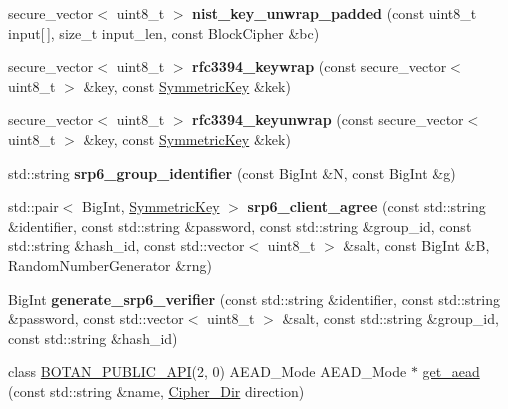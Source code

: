 \begin{DoxyCompactItemize}
\item 
\mbox{\label{namespace_botan_af6058b9d2ad2f93bddfb99ed6e6d6c7e}} 
secure\+\_\+vector$<$ uint8\+\_\+t $>$ {\bfseries nist\+\_\+key\+\_\+unwrap\+\_\+padded} (const uint8\+\_\+t input\mbox{[}$\,$\mbox{]}, size\+\_\+t input\+\_\+len, const Block\+Cipher \&bc)
\item 
\mbox{\label{namespace_botan_ad9093b300739b9305dcddeef2fdabd4f}} 
secure\+\_\+vector$<$ uint8\+\_\+t $>$ {\bfseries rfc3394\+\_\+keywrap} (const secure\+\_\+vector$<$ uint8\+\_\+t $>$ \&key, const \mbox{\hyperlink{namespace_botan_a89cf6c3513428f524454d01830221a88}{Symmetric\+Key}} \&kek)
\item 
\mbox{\label{namespace_botan_afbd37554903b2d7dc23b582e866b7b44}} 
secure\+\_\+vector$<$ uint8\+\_\+t $>$ {\bfseries rfc3394\+\_\+keyunwrap} (const secure\+\_\+vector$<$ uint8\+\_\+t $>$ \&key, const \mbox{\hyperlink{namespace_botan_a89cf6c3513428f524454d01830221a88}{Symmetric\+Key}} \&kek)
\item 
\mbox{\label{namespace_botan_a93bd21cfb41d35b060ae22dfbc366c22}} 
std\+::string {\bfseries srp6\+\_\+group\+\_\+identifier} (const Big\+Int \&N, const Big\+Int \&g)
\item 
\mbox{\label{namespace_botan_a23b9d9cc8d0b378865bcc049a88b7a78}} 
std\+::pair$<$ Big\+Int, \mbox{\hyperlink{namespace_botan_a89cf6c3513428f524454d01830221a88}{Symmetric\+Key}} $>$ {\bfseries srp6\+\_\+client\+\_\+agree} (const std\+::string \&identifier, const std\+::string \&password, const std\+::string \&group\+\_\+id, const std\+::string \&hash\+\_\+id, const std\+::vector$<$ uint8\+\_\+t $>$ \&salt, const Big\+Int \&B, Random\+Number\+Generator \&rng)
\item 
\mbox{\label{namespace_botan_a1967cc8d60add19e44753e8d74c8667e}} 
Big\+Int {\bfseries generate\+\_\+srp6\+\_\+verifier} (const std\+::string \&identifier, const std\+::string \&password, const std\+::vector$<$ uint8\+\_\+t $>$ \&salt, const std\+::string \&group\+\_\+id, const std\+::string \&hash\+\_\+id)
\item 
class \mbox{\hyperlink{namespace_botan_a6b9388030d872e586a4655b776ac9501}{B\+O\+T\+A\+N\+\_\+\+P\+U\+B\+L\+I\+C\+\_\+\+A\+PI}}(2, 0) A\+E\+A\+D\+\_\+\+Mode A\+E\+A\+D\+\_\+\+Mode $\ast$ \mbox{\hyperlink{namespace_botan_a22646ab3e050b0bf8f3ec55184c467c6}{get\+\_\+aead}} (const std\+::string \&name, \mbox{\hyperlink{namespace_botan_a8d9547a8fb3e868810b169b20ac389ee}{Cipher\+\_\+\+Dir}} direction)

\end{DoxyCompactItemize}
